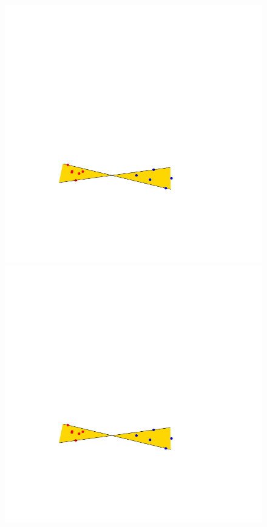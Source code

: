 \documentclass[12pt]{article}%
\begin{document}
\begin{figure}[h]
    \phantom{}
    \hfill%
    \includegraphics[page=1]{figs/bad_example}
    \hfill%
    \includegraphics[page=2]{figs/bad_example}

\end{figure}
\end{document}
